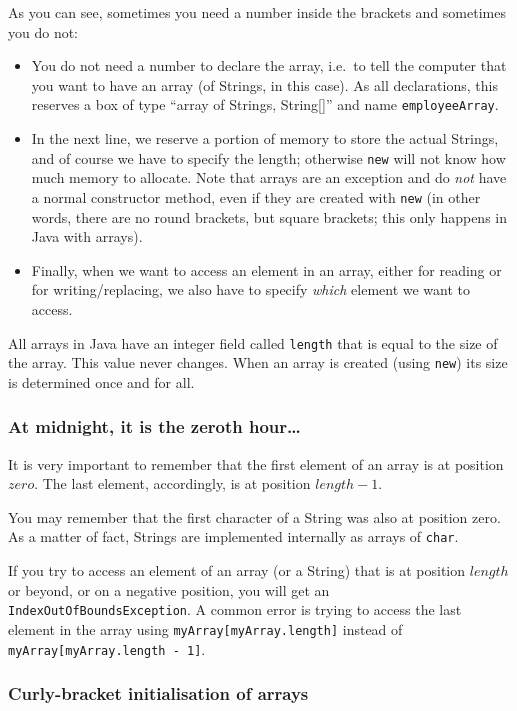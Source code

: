 As you can see, sometimes you need a number inside the brackets and
sometimes you do not: 

\begin{itemize}
\item You do not need a number to declare the array, i.e.~to tell the
  computer that you want to have an array (of Strings, in this
  case). As all declarations, this reserves a box of type ``array of
  Strings, String[]'' and name \verb+employeeArray+.
\item In the next line, we reserve a portion of memory to store the
  actual Strings, and of course we have to specify the length;
  otherwise \verb+new+ will not know how much memory to allocate. Note
  that arrays are an exception and do \emph{not} have a normal
  constructor method, even if they are created with \verb+new+ (in
  other words, there are no round brackets, but square brackets; this
  only happens in Java with arrays). 
\item Finally, when we want to access an element in an array, either
  for reading or for writing/replacing, we also have to specify
  \emph{which} element we want to access.
\end{itemize}

All arrays in Java have an integer field called \verb+length+ that is equal to
the size of the array. This value never changes. When an array is
created (using \verb+new+) its size is determined once and for all. 

\subsubsection*{At midnight, it is the zeroth hour\ldots}
\label{sec:at-midnight-it}

It is very important to remember that the first element of an array is
at position $zero$. The last element, accordingly, is at position 
$length - 1$. 

You may remember that the first character of a String was also at
position zero. As a matter of fact, Strings are implemented internally
as arrays of \verb+char+. 

If you try to access an element of an array (or a String) that is at
position $length$ or beyond, or on a negative position, you will get
an \verb+IndexOutOfBoundsException+. A common error is trying to
access the last element in the array using
\verb+myArray[myArray.length]+ instead 
of \verb+myArray[myArray.length - 1]+.

\subsubsection*{Curly-bracket initialisation of arrays}
\label{sec:curly-brack-init}

